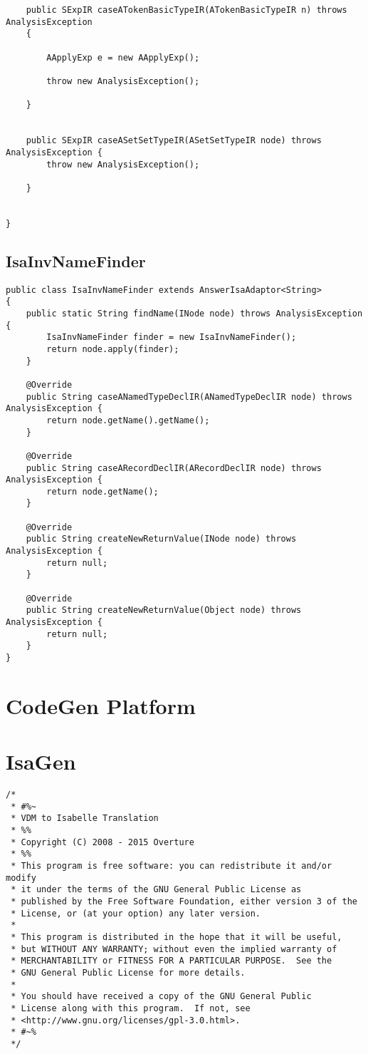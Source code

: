 \begin{appendices}
\begin{lstlisting}
    public SExpIR caseATokenBasicTypeIR(ATokenBasicTypeIR n) throws AnalysisException
    {

        AApplyExp e = new AApplyExp();

        throw new AnalysisException();

    }


    public SExpIR caseASetSetTypeIR(ASetSetTypeIR node) throws AnalysisException {
        throw new AnalysisException();

    }


}
\end{lstlisting}

\subsection{IsaInvNameFinder} \label{IsaInvNameFinderbefore}
\begin{lstlisting}
public class IsaInvNameFinder extends AnswerIsaAdaptor<String>
{
    public static String findName(INode node) throws AnalysisException {
        IsaInvNameFinder finder = new IsaInvNameFinder();
        return node.apply(finder);
    }

    @Override
    public String caseANamedTypeDeclIR(ANamedTypeDeclIR node) throws AnalysisException {
        return node.getName().getName();
    }

    @Override
    public String caseARecordDeclIR(ARecordDeclIR node) throws AnalysisException {
        return node.getName();
    }

    @Override
    public String createNewReturnValue(INode node) throws AnalysisException {
        return null;
    }

    @Override
    public String createNewReturnValue(Object node) throws AnalysisException {
        return null;
    }
}
\end{lstlisting}

\section{CodeGen Platform}
\section{IsaGen} \label{IsaGenbefore}
\begin{lstlisting}
/*
 * #%~
 * VDM to Isabelle Translation
 * %%
 * Copyright (C) 2008 - 2015 Overture
 * %%
 * This program is free software: you can redistribute it and/or modify
 * it under the terms of the GNU General Public License as
 * published by the Free Software Foundation, either version 3 of the
 * License, or (at your option) any later version.
 * 
 * This program is distributed in the hope that it will be useful,
 * but WITHOUT ANY WARRANTY; without even the implied warranty of
 * MERCHANTABILITY or FITNESS FOR A PARTICULAR PURPOSE.  See the
 * GNU General Public License for more details.
 * 
 * You should have received a copy of the GNU General Public
 * License along with this program.  If not, see
 * <http://www.gnu.org/licenses/gpl-3.0.html>.
 * #~%
 */


\end{lstlisting}
\end{appendices}
